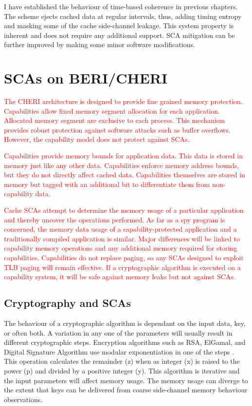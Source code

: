 	I have established the behaviour of time-based coherence in previous chapters. The scheme  ejects cached data at regular intervals, thus, adding timing entropy and masking some of the cache side-channel leakage. This system property is inherent and does not require any additional support. SCA mitigation can be further improved by making some minor software modifications.

\section{SCAs on BERI/CHERI}
	\textcolor{red}{The CHERI architecture is designed to provide fine grained memory protection. Capabilities allow fixed memory segment allocation for each application. Allocated memory segment are exclusive to each process. This mechanism provides robust protection against software attacks such as buffer overflows. However, the capability model does not protect against SCAs.}

	\textcolor{red}{Capabilities provide memory bounds for application data. This data is stored in memory just like any other data. Capabilities enforce memory address bounds, but they do not directly affect cached data. Capabilities themselves are stored in memory but tagged with an additional bit to differentiate them from non-capability data.}

	\textcolor{red}{Cache SCAs attempt to determine the memory usage of a particular application and thereby uncover the operations performed. As far as a spy program is concerned, the memory data usage of a capability-protected application and a traditionally compiled application is similar. Major differences will be linked to capability memory operations and any additional memory required for storing capabilities. Capabilities do not replace paging, so any SCAs designed to exploit TLB paging will remain effective. If a cryptographic algorithm is executed on a capability system, it will be safe against memory leaks but not against SCAs.}

	\subsection{Cryptography and SCAs}
		The behaviour of a cryptographic algorithm is dependant on the input data, key, or often both. A variation in any one of the parameters will usually result in different cryptographic steps. Encryption algorithms such as RSA, ElGamal, and Digital Signature Algorithm use modular exponentiation in one of the steps \cite{Daly02}. This operation calculates the remainder (z) when as integer (x) is raised to the power (p) and divided by a positive integer (y). This algorithm is iterative and the input parameters will affect memory usage. The memory usage can diverge to the extent that keys can be delivered from coarse side-channel memory behaviour observations.
	
